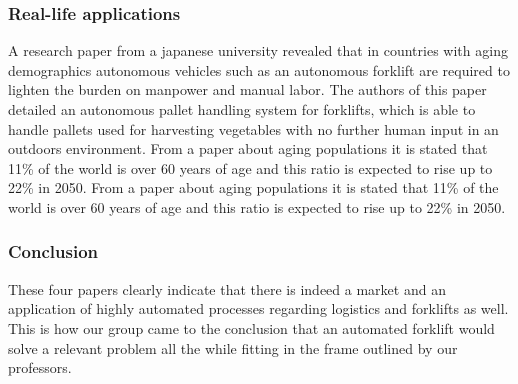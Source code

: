 \documentclass[../report.tex]{subfiles}
\begin{document}
    \subsubsection{Real-life applications}
    A research paper from a japanese university revealed 
    that in countries with aging demographics autonomous 
    vehicles such as an autonomous forklift are required 
    to lighten the burden on manpower and manual labor. 
    The authors of this paper detailed an autonomous pallet 
    handling system for forklifts, which is able to handle 
    pallets used for harvesting vegetables with no further 
    human input in an outdoors environment.
    From a paper about aging populations it is stated that 
    11\% of the world is over 60 years of age and this ratio 
    is expected to rise up to 22\% in 2050.
    From a paper about aging populations it is stated that 
    11\% of the world is over 60 years of age and this ratio 
    is expected to rise up to 22\% in 2050.

    \subsubsection{Conclusion}
    These four papers clearly indicate that there is indeed 
    a market and an application of highly automated processes
    regarding logistics and forklifts as well. This is how
    our group came to the conclusion that an automated
    forklift would solve a relevant problem all the while 
    fitting in the frame outlined by our professors. 
\end{document}

